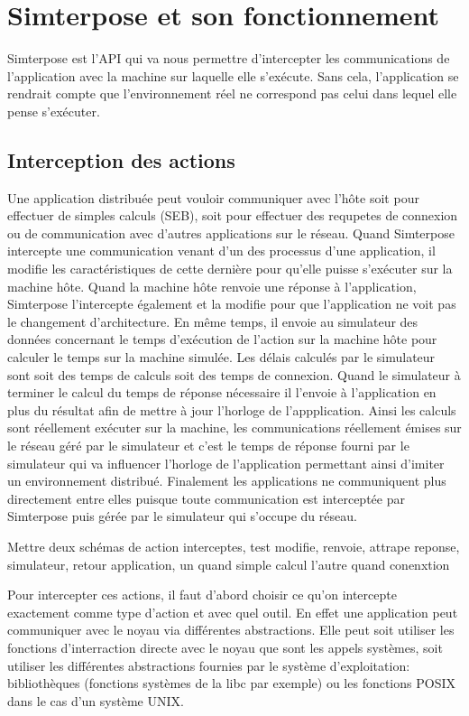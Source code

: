 \section{Simterpose et son fonctionnement}
Simterpose est l'API qui va nous permettre d'intercepter les communications de
l'application avec la machine sur laquelle elle s'exécute. Sans cela,
l'application se rendrait compte que l'environnement réel ne correspond pas
celui dans lequel elle pense s'exécuter.

\subsection{Interception des actions}
 Une application distribuée peut vouloir communiquer avec l'hôte soit pour
 effectuer de simples calculs (SEB), soit pour effectuer des requpetes de
 connexion ou de communication avec d'autres applications sur le réseau. Quand
 Simterpose intercepte une communication venant d'un des processus d'une
 application, il modifie les caractéristiques de cette dernière pour qu'elle
 puisse s'exécuter sur la machine hôte. Quand la machine hôte renvoie une
 réponse à l'application, Simterpose l'intercepte également et la modifie pour
 que l'application ne voit pas le changement d'architecture. En même temps, il
 envoie au simulateur des données concernant le temps d'exécution de l'action
 sur la machine hôte pour calculer le temps sur la machine simulée. Les délais
 calculés par le simulateur sont soit des temps de calculs soit des temps de
 connexion. Quand le simulateur à terminer le calcul du temps de réponse
 nécessaire il l'envoie à l'application en plus du résultat afin de mettre à
 jour l'horloge de l'appplication. Ainsi les calculs sont réellement exécuter
 sur la machine, les communications réellement émises sur le réseau géré par le
 simulateur et c'est le temps de réponse fourni par le simulateur qui va
 influencer l'horloge de l'application permettant ainsi d'imiter un
 environnement distribué. Finalement les applications ne communiquent plus
 directement entre elles puisque toute communication est interceptée par
 Simterpose puis gérée par le simulateur qui s'occupe du réseau.

{\color{red} Mettre deux schémas de action interceptes, test modifie, renvoie,
  attrape reponse, simulateur, retour application, un quand simple calcul l'autre quand conenxtion}

Pour intercepter ces actions, il faut d'abord choisir ce qu'on intercepte
exactement comme type d'action et avec quel outil. En effet une application peut
communiquer avec le noyau via différentes abstractions. Elle peut soit utiliser
les fonctions d'interraction directe avec le noyau que sont les appels systèmes,
soit utiliser les différentes abstractions fournies par le système
d'exploitation: bibliothèques (fonctions systèmes de la libc par exemple) ou les
fonctions POSIX dans le cas d'un système UNIX.

